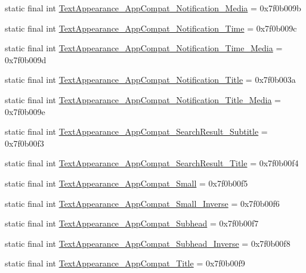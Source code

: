 \begin{CompactItemize}
static final int \hyperlink{classandroid_1_1support_1_1v7_1_1cardview_1_1_r_1_1style_12e20dd183b613f8d565a025c56f61a2}{TextAppearance\_\-AppCompat\_\-Notification\_\-Media} = 0x7f0b009b
\item 
static final int \hyperlink{classandroid_1_1support_1_1v7_1_1cardview_1_1_r_1_1style_dbf7b1efe60a35cac7c1ca152e896d01}{TextAppearance\_\-AppCompat\_\-Notification\_\-Time} = 0x7f0b009c
\item 
static final int \hyperlink{classandroid_1_1support_1_1v7_1_1cardview_1_1_r_1_1style_2466d9a593dd18df8270865a5fa7de44}{TextAppearance\_\-AppCompat\_\-Notification\_\-Time\_\-Media} = 0x7f0b009d
\item 
static final int \hyperlink{classandroid_1_1support_1_1v7_1_1cardview_1_1_r_1_1style_a19b5deebe3d040395b7ec9817cd52a3}{TextAppearance\_\-AppCompat\_\-Notification\_\-Title} = 0x7f0b003a
\item 
static final int \hyperlink{classandroid_1_1support_1_1v7_1_1cardview_1_1_r_1_1style_66390c9230d67a8faac7e44b0040c4a9}{TextAppearance\_\-AppCompat\_\-Notification\_\-Title\_\-Media} = 0x7f0b009e
\item 
static final int \hyperlink{classandroid_1_1support_1_1v7_1_1cardview_1_1_r_1_1style_e9851bc5c0360b770db59320a4d21b9c}{TextAppearance\_\-AppCompat\_\-SearchResult\_\-Subtitle} = 0x7f0b00f3
\item 
static final int \hyperlink{classandroid_1_1support_1_1v7_1_1cardview_1_1_r_1_1style_5d0b1d6969b58ae996e9072967be4e8e}{TextAppearance\_\-AppCompat\_\-SearchResult\_\-Title} = 0x7f0b00f4
\item 
static final int \hyperlink{classandroid_1_1support_1_1v7_1_1cardview_1_1_r_1_1style_b6800add1910766594297d558d0bcd45}{TextAppearance\_\-AppCompat\_\-Small} = 0x7f0b00f5
\item 
static final int \hyperlink{classandroid_1_1support_1_1v7_1_1cardview_1_1_r_1_1style_14bec9ebff7bb30bb8844fd462e10680}{TextAppearance\_\-AppCompat\_\-Small\_\-Inverse} = 0x7f0b00f6
\item 
static final int \hyperlink{classandroid_1_1support_1_1v7_1_1cardview_1_1_r_1_1style_b788ed56c12923a5369d54ee7d35699c}{TextAppearance\_\-AppCompat\_\-Subhead} = 0x7f0b00f7
\item 
static final int \hyperlink{classandroid_1_1support_1_1v7_1_1cardview_1_1_r_1_1style_1b386bcb79efcafc7d108e17ce9a626c}{TextAppearance\_\-AppCompat\_\-Subhead\_\-Inverse} = 0x7f0b00f8
\item 
static final int \hyperlink{classandroid_1_1support_1_1v7_1_1cardview_1_1_r_1_1style_d1ff5c2a513619766e9022b04711a4ae}{TextAppearance\_\-AppCompat\_\-Title} = 0x7f0b00f9

\end{CompactItemize}
